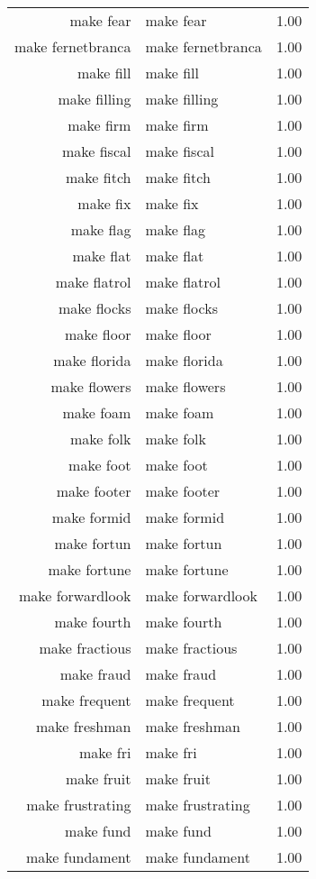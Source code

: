 \begin{table}[ht]
\begin{tabular}{rlr}
  make fear & make fear & 1.00 \\ 
  make fernetbranca & make fernetbranca & 1.00 \\ 
  make fill & make fill & 1.00 \\ 
  make filling & make filling & 1.00 \\ 
  make firm & make firm & 1.00 \\ 
  make fiscal & make fiscal & 1.00 \\ 
  make fitch & make fitch & 1.00 \\ 
  make fix & make fix & 1.00 \\ 
  make flag & make flag & 1.00 \\ 
  make flat & make flat & 1.00 \\ 
  make flatrol & make flatrol & 1.00 \\ 
  make flocks & make flocks & 1.00 \\ 
  make floor & make floor & 1.00 \\ 
  make florida & make florida & 1.00 \\ 
  make flowers & make flowers & 1.00 \\ 
  make foam & make foam & 1.00 \\ 
  make folk & make folk & 1.00 \\ 
  make foot & make foot & 1.00 \\ 
  make footer & make footer & 1.00 \\ 
  make formid & make formid & 1.00 \\ 
  make fortun & make fortun & 1.00 \\ 
  make fortune & make fortune & 1.00 \\ 
  make forwardlook & make forwardlook & 1.00 \\ 
  make fourth & make fourth & 1.00 \\ 
  make fractious & make fractious & 1.00 \\ 
  make fraud & make fraud & 1.00 \\ 
  make frequent & make frequent & 1.00 \\ 
  make freshman & make freshman & 1.00 \\ 
  make fri & make fri & 1.00 \\ 
  make fruit & make fruit & 1.00 \\ 
  make frustrating & make frustrating & 1.00 \\ 
  make fund & make fund & 1.00 \\ 
  make fundament & make fundament & 1.00 \\ 

\end{tabular}
\end{table}
